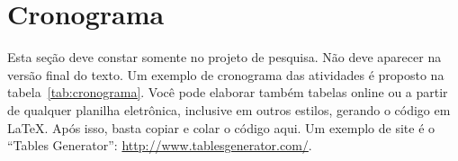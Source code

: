 \documentclass[
	12pt,				%
	oneside, %
	a4paper,			%
	english,			%
	brazil				%
	]{abntex2}
\begin{document}

\section{Cronograma}

Esta seção deve constar somente no projeto de pesquisa. Não deve aparecer na versão final do texto. Um exemplo de cronograma das atividades é proposto na tabela~\ref{tab:cronograma}. Você pode elaborar também tabelas online ou a partir de qualquer planilha eletrônica, inclusive em outros estilos, gerando o código em \LaTeX. Após isso, basta copiar e colar o código aqui. Um exemplo de site é o ``Tables Generator'': \url{http://www.tablesgenerator.com/}.

\begin{table}[htpb] 
	\centering
	\caption{Cronograma de atividades.}
	\label{tab:cronograma}
\end{table}
\end{document}
